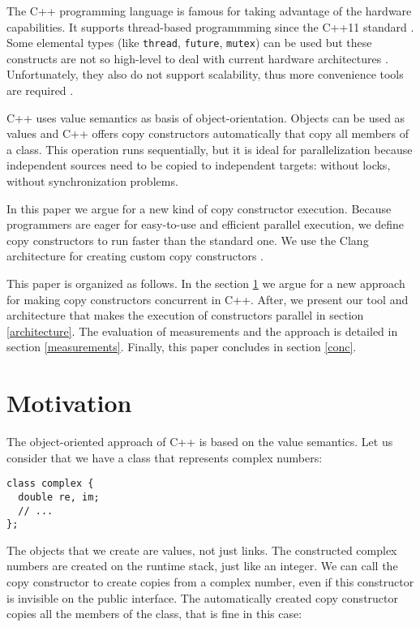 \documentclass{article}
\begin{document}
The C++ programming language is famous for taking advantage of the hardware capabilities. It
supports thread-based programmming since the C++11 standard \cite{batty:math}. Some elemental
types (like \texttt{thread}, \texttt{future}, \texttt{mutex}) can be used but these constructs
are not so high-level to deal with current hardware architectures \cite{stroustrup:cpp}.
Unfortunately, they also do not support scalability, thus more convenience tools are
required \cite{lupin:fastflow,lupin:multicore,lupin:stl}.

C++ uses value semantics as basis of object-orientation. Objects can be used as values and C++
offers copy constructors automatically that copy all members of a class. This operation runs
sequentially, but it is ideal for parallelization because independent sources need to be copied
to independent targets: without locks, without synchronization problems.

In this paper we argue for a new kind of copy constructor execution. Because programmers are eager
for easy-to-use and efficient parallel execution, we define copy constructors to run faster than
the standard one. We use the Clang architecture for creating custom copy constructors \cite{lattner:clang}.

This paper is organized as follows. In the section \ref{motivation} we argue for a new approach
for making copy constructors concurrent in C++. After, we present our tool and architecture that
makes the execution of constructors parallel in section \ref{architecture}. The evaluation of
measurements and the approach is detailed in section \ref{measurements}. Finally, this paper
concludes in section \ref{conc}.

\section{Motivation}
\label{motivation}

The object-oriented approach of C++ is based on the value semantics. Let us consider that we
have a class that represents complex numbers:

\begin{verbatim}
class complex {
  double re, im;
  // ...
};
\end{verbatim}

The objects that we create are values, not just links. The constructed complex numbers are
created on the runtime stack, just like an integer. We can call the copy constructor to
create copies from a complex number, even if this constructor is invisible on the public
interface. The automatically created copy constructor copies all the members of the class,
that is fine in this case:
\end{document}
